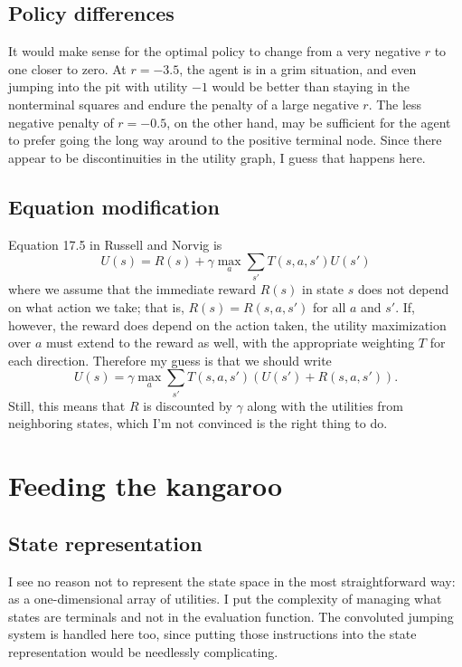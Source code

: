 \documentclass[letterpaper, 10pt]{article}
\begin{document}
\begin{multicols*}{2}
\subsection{Policy differences}
It would make sense for the optimal policy to change from a very negative $r$ to one closer to zero.
At $r = -3.5$, the agent is in a grim situation, and even jumping into the pit with utility $-1$ would be better than staying in the nonterminal squares and endure the penalty of a large negative $r$.
The less negative penalty of $r = -0.5$, on the other hand, may be sufficient for the agent to prefer going the long way around to the positive terminal node. 
Since there appear to be discontinuities in the utility graph, I guess that happens here.

\subsection{Equation modification}
Equation 17.5 in Russell and Norvig is 
\[ U(s) = R(s) + \gamma \max_a \sum_{s'} T(s, a, s') U(s') \]
where we assume that the immediate reward $R(s)$ in state $s$ does not depend on what action we take; that is, $R(s) = R(s, a, s')$ for all $a$ and $s'$. 
If, however, the reward does depend on the action taken, the utility maximization over $a$ must extend to the reward as well, with the appropriate weighting $T$ for each direction. 
Therefore my guess is that we should write 
\[  U(s) = \gamma \max_a \sum_{s'} T(s, a, s') \left( U(s') + R(s, a, s') \right). \]
Still, this means that $R$ is discounted by $\gamma$ along with the utilities from neighboring states, which I'm not convinced is the right thing to do. 


\section{Feeding the kangaroo}
\subsection{State representation}
I see no reason not to represent the state space in the most straightforward way: as a one-dimensional array of utilities. 
I put the complexity of managing what states are terminals and not in the evaluation function. 
The convoluted jumping system is handled here too, since putting those instructions into the state representation would be needlessly complicating. 


\end{multicols*}
\end{document}

